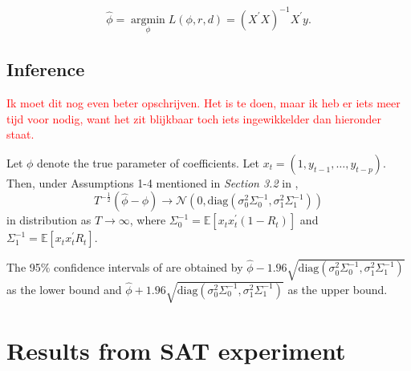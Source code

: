 \documentclass{article}
\newcommand{\E}{\mathbb{E}}
\DeclareMathOperator*{\argmin}{argmin}
\begin{document}
$$\hat{\phi} = \argmin\limits_{\phi} L(\phi, r, d) = 
(X^\prime X)^{-1} X^\prime y.$$

\subsection{Inference} \label{app:inference}
\textcolor{red}{Ik moet dit nog even beter opschrijven. Het is te doen, maar ik heb er iets meer tijd voor nodig, want het zit blijkbaar toch iets ingewikkelder dan hieronder staat.}

Let $\phi$ denote the true parameter of coefficients. Let $x_t = (1, y_{t-1}, \dots, y_{t-p})$.
Then, under Assumptions 1-4 mentioned in \textit{Section 3.2} in \citet{bar2}, 
$$T^{-\frac{1}{2}} (\hat{\phi} - \phi) \rightarrow \mathcal{N} \left( 0, \mathrm{diag}(\sigma_0^2 \Sigma_0^{-1}, \sigma_1^2 \Sigma_1^{-1}) \right)$$
in distribution as $T \rightarrow \infty$, where
$\Sigma_0^{-1} = \E[x_t x_t^\prime (1-R_t)]$ and 
$\Sigma_1^{-1} = \E[x_t x_t^\prime R_t].$

The 95\% confidence intervals of are obtained by
$\hat{\phi} - 1.96 \sqrt{\mathrm{diag}(\sigma_0^2 \Sigma_0^{-1}, \sigma_1^2 \Sigma_1^{-1})}$ as the lower bound and 
$\hat{\phi} + 1.96 \sqrt{\mathrm{diag}(\sigma_0^2 \Sigma_0^{-1}, \sigma_1^2 \Sigma_1^{-1})}$ as the upper bound.

\section{Results from SAT experiment}
\label{app:results_SAT}
\end{document}
